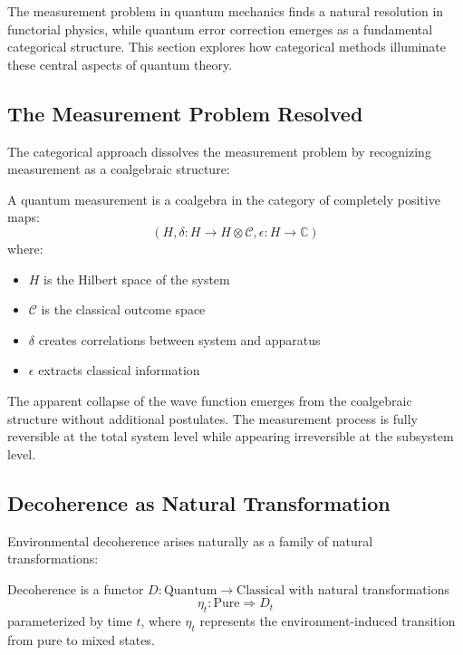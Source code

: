 The measurement problem in quantum mechanics finds a natural resolution in functorial physics, while quantum error correction emerges as a fundamental categorical structure. This section explores how categorical methods illuminate these central aspects of quantum theory.

\subsection{The Measurement Problem Resolved}

The categorical approach dissolves the measurement problem by recognizing measurement as a coalgebraic structure:

\begin{definition}
A quantum measurement is a coalgebra in the category of completely positive maps:
\[
(H, \delta: H \to H \otimes \mathcal{C}, \epsilon: H \to \mathbb{C})
\]
where:
\begin{itemize}
\item $H$ is the Hilbert space of the system
\item $\mathcal{C}$ is the classical outcome space
\item $\delta$ creates correlations between system and apparatus
\item $\epsilon$ extracts classical information
\end{itemize}
\end{definition}

\begin{theorem}
The apparent collapse of the wave function emerges from the coalgebraic structure without additional postulates. The measurement process is fully reversible at the total system level while appearing irreversible at the subsystem level.
\end{theorem}

\subsection{Decoherence as Natural Transformation}

Environmental decoherence arises naturally as a family of natural transformations:

\begin{definition}
Decoherence is a functor $D: \text{Quantum} \to \text{Classical}$ with natural transformations
\[
\eta_t: \text{Pure} \Rightarrow D_t
\]
parameterized by time $t$, where $\eta_t$ represents the environment-induced transition from pure to mixed states.
\end{definition}

